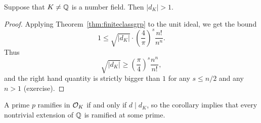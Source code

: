 \begin{corollary}
Suppose that $K\neq \mathbb{Q}$ is a number field.  Then $|d_K|>1$.
\end{corollary}
\begin{proof}
Applying Theorem~\ref{thm:finiteclassgrp} to the unit ideal,
we get the bound
\[
 1\leq \sqrt{|d_K|}\cdot \left(\frac{4}{\pi}\right)^s\frac{n!}{n^n}.
\]
Thus 
\[
 \sqrt{|d_K|} 
  \geq 
\left(\frac{\pi}{4}\right)^s\frac{n^n}{n!},
\]
and the right hand quantity is strictly bigger than $1$ for
any $s\leq n/2$ and any $n>1$ (exercise).
\end{proof}

A prime $p$ ramifies in $\mathcal{O}_K$ if and only if $d\mid d_K$,
so the corollary implies that every nontrivial extension of $\mathbb{Q}$
is ramified at some prime.

